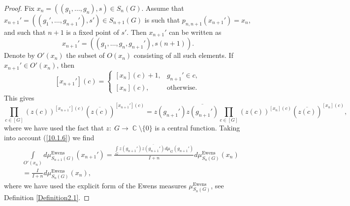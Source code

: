 \documentclass[12pt]{amsart}
\theoremstyle{definition}
\numberwithin{equation}{section}
\DeclareMathOperator{\C}{\mathbb{C}}
\DeclareMathOperator{\Ewens}{Ewens}
\begin{document}
\begin{proof}Fix $x_n=\left(\left(g_1,\ldots,g_n\right),s\right)\in S_n\left(G\right)$. Assume that
$x_{n+1}'=\left(\left(g_1',\ldots,g_{n+1}'\right),s'\right)\in S_{n+1}(G)$ is such that $p_{n,n+1}(x_{n+1}')=x_n$, and
such that $n+1$ is a fixed point of $s'$. Then $x_{n+1}'$ can be written as
$$
x_{n+1}'=\left(\left(g_1,\ldots,g_n,g_{n+1}'\right),s(n+1)\right).
$$
Denote by $O'(x_n)$ the subset of $O(x_n)$ consisting of all such elements. If $x_{n+1}'\in O'(x_n)$, then
\begin{equation}\label{10.1.5}
\left[x_{n+1}'\right](c)=\left\{
\begin{array}{ll}
\left[x_{n}\right](c)+1, &  g_{n+1}'\in c,\\
\left[x_{n}\right](c), & \mbox{otherwise}.
\end{array}
\right.
\end{equation}
This gives
\begin{equation}\label{10.1.6}
\prod\limits_{c\in\left[G\right]}\left(z(c)\right)^{\left[x_{n+1}'\right](c)}
\left(\overline{z(c)}\right)^{\left[x_{n+1}'\right](c)}
=z\left(g_{n+1}'\right)\overline{z\left(g_{n+1}'\right)}
\prod\limits_{c\in\left[G\right]}\left(z(c)\right)^{\left[x_{n}\right](c)}
\left(\overline{z(c)}\right)^{\left[x_{n}\right](c)},
\end{equation}
where we have used the fact that  $z:\; G\rightarrow \C\setminus\{0\}$ is a central function.
Taking into account (\ref{10.1.6}) we find
\begin{equation}\label{O(1)}
\begin{split}
&\int\limits_{O'(x_n)}d\mu^{\Ewens}_{S_{n+1}(G)}(x_{n+1}')=\frac{\int\limits_{G}z\left(g_{n+1}'\right)\overline{z\left(g_{n+1}'\right)}d\mu_{G}\left(g_{n+1}'\right)}
{I+n}d\mu_{S_n(G)}^{\Ewens}(x_n)\\
&=\frac{I}{I+n}d\mu_{S_n(G)}^{\Ewens}\left(x_n\right),
\end{split}
\end{equation}
where we have used the explicit form of the Ewens measures $\mu_{S_n(G)}^{\Ewens}$, see Definition \ref{Definition2.1}.


\end{proof}
\end{document}
